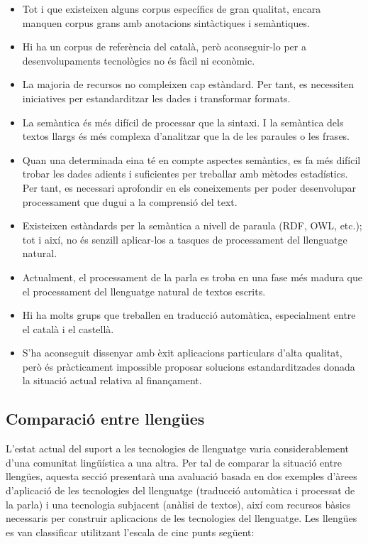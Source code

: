 \begin{multicols}{2}
\begin{itemize}
\item Tot i que existeixen alguns corpus específics de gran qualitat, encara manquen corpus grans amb anotacions sintàctiques i semàntiques. 
\item Hi ha un corpus de referència del català, però aconseguir-lo per a desenvolupaments tecnològics no és fàcil ni econòmic.
\item La majoria de recursos no compleixen cap estàndard. Per tant, es necessiten iniciatives per estandarditzar les dades i transformar formats. 
\item La semàntica és més difícil de processar que la sintaxi. I la semàntica dels textos llargs és més complexa d’analitzar que la de les paraules o les frases. 
\item Quan una determinada eina té en compte aspectes semàntics, es fa més difícil trobar les dades adients i suficientes per treballar amb mètodes estadístics. Per tant, es necessari aprofondir en els coneixements per poder desenvolupar processament que dugui a la comprensió del text. 
\item Existeixen estàndards per la semàntica a nivell de paraula (RDF, OWL, etc.); tot i així, no és senzill aplicar-los a tasques de processament del llenguatge natural. 
\item Actualment, el processament de la parla es troba en una fase més madura que el processament del llenguatge natural de textos escrits. 
\item Hi ha molts grups que treballen en traducció automàtica, especialment entre el català i el castellà.
\item  S’ha aconseguit dissenyar amb èxit aplicacions particulars d’alta qualitat, però és pràcticament impossible proposar solucions estandarditzades donada la situació actual relativa al finançament.
\end{itemize}

\subsection{Comparació entre llengües}

L'estat actual del suport a les tecnologies de llenguatge varia considerablement d'una comunitat lingüística a una altra. Per tal de comparar la situació entre llengües, aquesta secció presentarà una avaluació basada en dos exemples d'àrees d'aplicació de les tecnologies del llenguatge (traducció automàtica i processat de la parla) i una tecnologia subjacent (anàlisi de textos), així com recursos bàsics necessaris per construir aplicacions de les tecnologies del llenguatge.
Les llengües es van classificar utilitzant l'escala de cinc punts següent:


\end{multicols}
